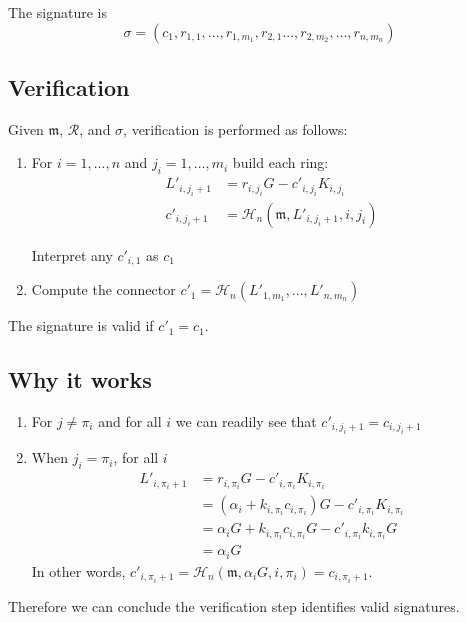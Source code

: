 The signature is
 \[\sigma = (c_1, r_{1, 1}, ..., r_{1, m_1}, r_{2,1} ..., r_{2,m_2}, ..., r_{n, m_n} )  \]


\subsection*{Verification}

Given \(\mathfrak{m}\), $\mathcal{R}$, and $\sigma$, verification is performed as follows:

\begin{enumerate}
	
	\item For \(i = 1, ..., n \) and \(j_i = 1, ..., m_i \) build each ring:\\
	\begin{align*}
	   L'_{i, j_i+1} &= r_{i, j_i} G - c'_{i, j_i} K_{i, j_i} \\
	   c'_{i, j_i+1} &= \mathcal{H}_n (\mathfrak{m}, L'_{i, j_i+1}, i, j_i) 
	\end{align*}
	
	Interpret any \(c'_{i, 1}\) as \(c_1\)
	
	\item Compute the connector \(c'_1 = \mathcal{H}_n (L'_{1, m_1}, ..., L'_{n, m_n}) \)	
	
\end{enumerate}

The signature is valid if \(c'_1 = c_1\).



\subsection*{Why it works}


\begin{enumerate}
	\item For \(j \ne \pi_i\) and for all \(i\) we can readily see that \(c'_{i, j_i+1} = c_{i, j_i+1}\)
	
	\item When \(j_i = \pi_i\), for all \(i \)
	\begin{align*}
	L'_{i, \pi_i+1} &= r_{i, \pi_i} G - c'_{i, \pi_i} K_{i, \pi_i} \\
	              &= (\alpha_i + k_{i, \pi_i} c_{i, \pi_i}) G - c'_{i, \pi_i} K_{i, \pi_i} \\
	              &= \alpha_i G + k_{i, \pi_i} c_{i, \pi_{i}} G - c'_{i, \pi_i} k_{i, \pi_i} G \\
	              &= \alpha_i G 
	\end{align*}
	In other words, \(c'_{i, \pi_i+1} = \mathcal{H}_n(\mathfrak{m}, \alpha_i G, i, \pi_i) = c_{i, \pi_i+1}\).
	
\end{enumerate}

Therefore we can conclude the verification step identifies valid signatures.



